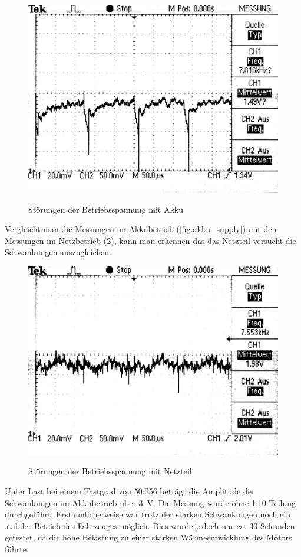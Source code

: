 \begin{figure}[H]
\centering
\includegraphics[width=.8\textwidth]{VCC_AKKU.png}\\
\caption{Störungen der Betriebsspannung mit Akku}%
\label{fig:accu_supply}
\end{figure}


Vergleicht man die Messungen im Akkubetrieb (\cref{fig:akku_supply}) mit den Messungen im Netzbetrieb (\cref{fig:power_supply}), kann man erkennen das das Netzteil versucht die Schwankungen auszugleichen.

\begin{figure}[H]
\centering
\includegraphics[width=.8\textwidth]{VCC_SUPPLY.png}\\
\caption{Störungen der Betriebsspannung mit Netzteil}%
\label{fig:power_supply}
\end{figure}

Unter Last bei einem Tastgrad von 50:256 beträgt die Amplitude der Schwankungen im Akkubetrieb über \SI{3}{V}. Die Messung wurde ohne 1:10 Teilung durchgeführt.
Erstaunlicherweise war trotz der starken Schwankungen noch ein stabiler Betrieb des Fahrzeuges möglich. Dies wurde jedoch nur ca. 30 Sekunden getestet, da
die hohe Belastung zu einer starken Wärmeentwicklung des Motors führte.

